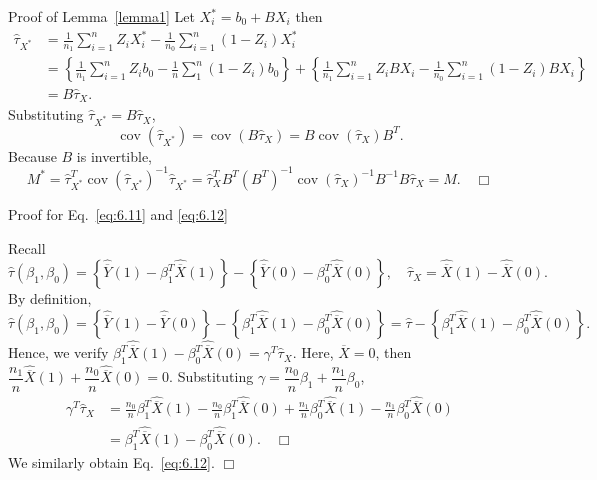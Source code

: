 \documentclass[aspectratio=169, 12pt]{beamer}
\begin{document}
\begin{frame}[label=pr-lemma-6-1]{Proof of Lemma~\ref{lemma1}}
  \small
  Let $X_i^*=b_0+BX_i$ then
  \begin{align*}
    \widehat{\tau}_{X^*}
    &= \frac{1}{n_1}\sum_{i=1}^{n}Z_iX_i^* - \frac{1}{n_0}\sum_{i=1}^{n}(1-Z_i)X_i^*\\
    &= \left\{\frac{1}{n_1}\sum_{i=1}^{n}Z_ib_0 - \frac{1}{n}\sum_{1}^{n}(1-Z_i)b_0\right\} + \left\{\frac{1}{n_1}\sum_{i=1}^{n}Z_iBX_i - \frac{1}{n_0}\sum_{i=1}^{n}(1-Z_i)BX_i\right\} \\
    &= B\widehat{\tau}_X.
  \end{align*}
  Substituting $\widehat{\tau}_{X^*}=B\widehat{\tau}_X$, 
  \[
  \operatorname{cov}(\widehat{\tau}_{X^*}) 
  = \operatorname{cov}(B\widehat{\tau}_X) 
  = B\operatorname{cov}(\widehat{\tau}_X)B^T.
  \]
  Because $B$ is invertible, 
  \[
  M^* =\widehat{\tau}_{X^*}^T\operatorname{cov}(\widehat{\tau}_{X^*})^{-1}\widehat{\tau}_{X^*}
  = \widehat{\tau}_X^TB^T(B^T)^{-1}\operatorname{cov}(\widehat{\tau}_X)^{-1}B^{-1}B\widehat{\tau}_X = M. \quad \Box
  \]
  \vfill
  \hfill\hyperlink{lemma-6-1<1>}{}
\end{frame}


\begin{frame}[label=pr-lin-cov-imbalance]{Proof for Eq.~\eqref{eq:6.11} and \eqref{eq:6.12}}

  {
    \small
    Recall 
    \[
    \widehat{\tau}(\beta_1,\beta_0)=\left\{\widehat{\overline{Y}}(1)-\beta_1^T\widehat{\overline{X}}(1)\right\}-\left\{\widehat{\overline{Y}}(0)-\beta_0^T\widehat{\overline{X}}(0)\right\}, 
    \quad
    \widehat{\tau}_X = \widehat{\overline{X}}(1)-\widehat{\overline{X}}(0).
    \]
    By definition, 
    \[
    \widehat{\tau}(\beta_1,\beta_0)=\left\{\widehat{\overline{Y}}(1)-\widehat{\overline{Y}}(0)\right\}-\left\{\beta_1^T\widehat{\overline{X}}(1)-\beta_0^T\widehat{\overline{X}}(0)\right\}=\widehat{\tau}-\left\{\beta_1^T\widehat{\overline{X}}(1)-\beta_0^T\widehat{\overline{X}}(0)\right\}.
    \] 
    Hence, we verify $\beta_1^T\widehat{\overline{X}}(1)-\beta_0^T\widehat{\overline{X}}(0)=\gamma^T\widehat{\tau}_X.$
    Here, $\overline{X}=0$, then $\dfrac{n_1}{n}\widehat{\overline{X}}(1)+\dfrac{n_0}{n}\widehat{\overline{X}}(0)=0.$
    Substituting $\gamma=\dfrac{n_0}{n}\beta_1+\dfrac{n_1}{n}\beta_0$,
    \begin{align*}
      \gamma^T\widehat{\tau}_X
    &= \frac{n_0}{n}\beta_1^T\widehat{\overline{X}}(1)-\frac{n_0}{n}\beta_1^T\widehat{\overline{X}}(0)+\frac{n_1}{n}\beta_0^T\widehat{\overline{X}}(1)-\frac{n_1}{n}\beta_0^T\widehat{\overline{X}}(0)\\
    &= \beta_1^T\widehat{\overline{X}}(1)-\beta_0^T\widehat{\overline{X}}(0). \quad \Box
    \end{align*}
    We similarly obtain Eq.~\eqref{eq:6.12}. $\Box$ 
  }
  \vfill
  \hfill\hyperlink{lin-cov-imbalance<1>}{}
\end{frame}
\end{document}
